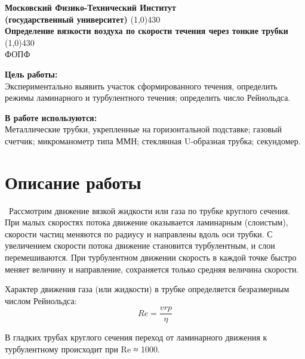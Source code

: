 \documentclass[11pt]{article}
\begin{document}
\begin{titlepage}
\begin{center}
\large\textbf{Московский Физико-Технический Институт}\\
\large\textbf{(государственный университет)}
\vfill
\line(1,0){430}\\[1mm]
\huge\textbf{Определение вязкости воздуха по скорости течения через тонкие трубки}\\
\line(1,0){430}\\[1mm]
\vfill
\large ФОПФ\\
\end{center}
\end{titlepage}
\noindent \textbf{Цель работы:} \\
\indent Экспериментально выявить участок сформированного течения, определить режимы ламинарного и турбулентного течения; определить число Рейнольдса.


\noindent \textbf{В работе используются:} \\
\indent Металлические трубки, укрепленные на горизонтальной подставке; газовый счетчик; микроманометр типа ММН; стеклянная U-образная трубка; секундомер.
\section*{Описание работы}\
\indent Рассмотрим движение вязкой жидкости или газа по трубке круглого сечения. При малых скоростях потока движение оказывается ламинарным (слоистым), скорости частиц меняются по радиусу и направлены вдоль оси трубки. С увеличением скорости потока движение
становится турбулентным, и слои перемешиваются. При турбулентном движении скорость в каждой точке быстро меняет величину и направление, сохраняется только средняя величина скорости.

Характер движения газа (или жидкости) в трубке определяется безразмерным числом Рейнольдса: $$Re=\frac{vrp}{\eta}$$

В гладких трубах круглого сечения переход от ламинарного движения к турбулентному происходит при Re ≈ 1000.
\end{document}
